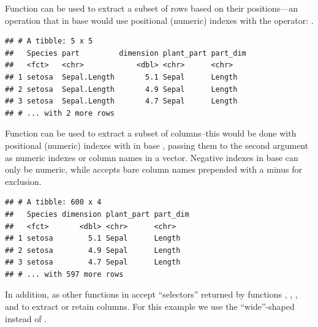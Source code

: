 \documentclass[krantz2]{krantz}\usepackage{knitr}
\begin{document}
Function  can be used to extract a subset of rows based on their positions---an operation that in base \Rlang would use positional (numeric) indexes with the \code{[ , ]} operator: .

\begin{knitrout}\footnotesize
{}\color{fgcolor}\begin{kframe}
\begin{alltt}
 \hlopt{:}\hlstd{)}
\end{alltt}
\begin{verbatim}
## # A tibble: 5 x 5
##   Species part         dimension plant_part part_dim
##   <fct>   <chr>            <dbl> <chr>      <chr>   
## 1 setosa  Sepal.Length       5.1 Sepal      Length  
## 2 setosa  Sepal.Length       4.9 Sepal      Length  
## 3 setosa  Sepal.Length       4.7 Sepal      Length  
## # ... with 2 more rows
\end{verbatim}
\end{kframe}
\end{knitrout}

Function  can be used to extract a subset of columns--this would be done with positional (numeric) indexes with \code{[ , ]} in base \Rlang, passing them to the second argument as numeric indexes or column names in a vector. Negative indexes in base \Rlang can only be numeric, while  accepts bare column names prepended with a minus for exclusion.

\begin{knitrout}\footnotesize
{}\color{fgcolor}\begin{kframe}
\begin{alltt}
 \hlopt{-}
\end{alltt}
\begin{verbatim}
## # A tibble: 600 x 4
##   Species dimension plant_part part_dim
##   <fct>       <dbl> <chr>      <chr>   
## 1 setosa        5.1 Sepal      Length  
## 2 setosa        4.9 Sepal      Length  
## 3 setosa        4.7 Sepal      Length  
## # ... with 597 more rows
\end{verbatim}
\end{kframe}
\end{knitrout}

In addition,  as other functions in  accept ``selectors'' returned by functions , , , and  to extract or retain columns. For this example we use the ``wide''-shaped  instead of .
\end{document}
